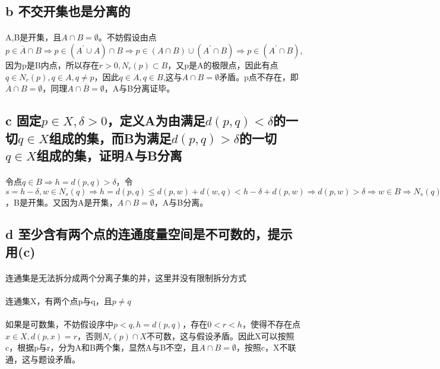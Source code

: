 \subsection*{b 不交开集也是分离的}
\paragraph{} A,B是开集，且$A\cap B = \emptyset$。不妨假设由点$p \in \overline{A} \cap B \Rightarrow p \in (A^{'}\cup A)\cap B \Rightarrow p \in (A \cap B) \cup (A^{'} \cap B) \Rightarrow p \in (A^{'} \cap B)$,因为p是B内点，所以存在$r>0, N_r(p) \subset B$，又p是A的极限点，因此有点$q \in N_r(p), q \in A, q \ne p $，因此$q \in A, q \in B $,这与$A \cap B = \emptyset$矛盾。p点不存在，即$\overline{A} \cap B = \emptyset$，同理$ A \cap \overline{B} = \emptyset$，A与B分离证毕。
\subsection*{c 固定$p\in X, \delta > 0$，定义A为由满足$d(p,q) < \delta$的一切$q \in X$组成的集，而B为满足$d(p, q) > \delta$的一切$q\in X$组成的集，证明A与B分离}
\paragraph{} 令点$q \in B \Rightarrow h = d(p, q) > \delta$，令$s = h - \delta, w \in N_s(q) \Rightarrow h = d(p, q) \le d(p,w) + d(w, q) < h - \delta + d(p, w) \Rightarrow d(p, w) > \delta \Rightarrow w \in B \Rightarrow N_s(q) \subset B$，B是开集。又因为A是开集，$A\cap B = \emptyset$，A与B分离。
\subsection*{d 至少含有两个点的连通度量空间是不可数的，提示用(c)}
\paragraph{} 连通集是无法拆分成两个分离子集的并，这里并没有限制拆分方式
\paragraph{} 连通集X，有两个点p与q，且$p \ne q$
\paragraph{} 如果是可数集，不妨假设序中$p < q, h = d(p, q)$，存在$0 < r < h$，使得不存在点$x \in X, d(p, x) = r$，否则$N_r(p) \cap X$不可数，这与假设矛盾。因此X可以按照c，根据p与r，分为A和B两个集，显然A与B不空，且$A \cap B = \emptyset $，按照c，X不联通，这与题设矛盾。
